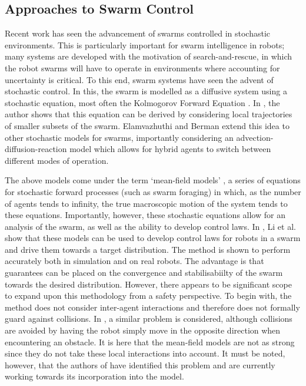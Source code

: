 \documentclass[.../main.tex]{subfiles}
\begin{document}
\subsection{Approaches to Swarm Control} \label{sec::Swarm Control}

Recent work has seen the advancement of swarms controlled in stochastic environments. This is
particularly important for swarm intelligence in robots; many systems are developed with the
motivation of search-and-rescue, in which the robot swarms will have to operate in environments
where accounting for uncertainty is critical. To this end, swarm systems have seen the advent of
stochastic control. In this, the swarm is modelled as a diffusive system using a stochastic
equation, most often the Kolmogorov Forward Equation \cite{Hamann2008}. In \cite{Hamann2008}, the
author shows that this equation can be derived by considering local trajectories of smaller subsets
of the swarm. Elamvazhuthi and Berman \cite{Elamvazhuthi2019} extend this idea to other stochastic
models for swarms, importantly considering an advection-diffusion-reaction model which allows for
hybrid agents to switch between different modes of operation. 

The above models come under the term ‘mean-field models’ \cite{Elamvazhuthi2019b}, a series of
equations for stochastic forward processes (such as swarm foraging) in which, as the number of
agents tends to infinity, the true macroscopic motion of the system tends to these equations.
Importantly, however, these stochastic equations allow for an analysis of the swarm, as well as the
ability to develop control laws. In \cite{Li2017}, Li et al. show that these models can be used to
develop control laws for robots in a swarm and drive them towards a target distribution. The method
is shown to perform accurately both in simulation and on real robots. The advantage is that
guarantees can be placed on the convergence and stabilisabiilty of the swarm towards the desired
distribution. However, there appears to be significant scope to expand upon this methodology from a
safety perspective. To begin with, the method does not consider inter-agent interactions and
therefore does not formally guard against collisions. In \cite{Inoue2019}, a similar problem is
considered, although collisions are avoided by having the robot simply move in the opposite
direction when encountering an obstacle. It is here that the mean-field models are not as strong
since they do not take these local interactions into account. It must be noted, however, that the
authors of \cite{Inoue2019} have identified this problem and are currently working towards its
incorporation into the model.
\end{document}
